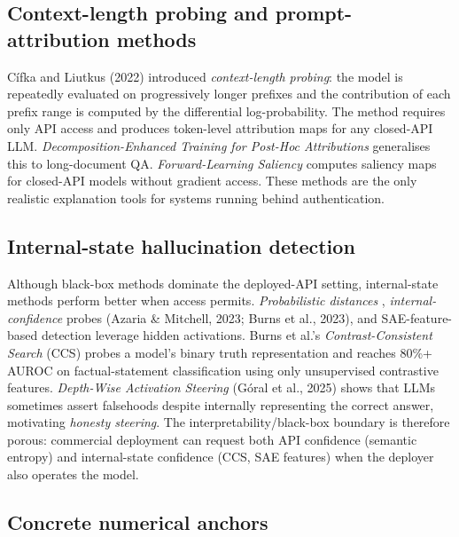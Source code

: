 \documentclass{article}
\begin{document}
\subsection{Context-length probing and prompt-attribution methods}\label{context-length-probing-and-prompt-attribution-methods}

Cífka and Liutkus (2022) introduced \emph{context-length probing}: the model is repeatedly evaluated on progressively longer prefixes and the contribution of each prefix range is computed by the differential log-probability. The method requires only API access and produces token-level attribution maps for any closed-API LLM. \emph{Decomposition-Enhanced Training for Post-Hoc Attributions} \citep{balasubramanian2025decompositionenhan} generalises this to long-document QA. \emph{Forward-Learning Saliency} \citep{zhang2024acomprehensivestud} computes saliency maps for closed-API models without gradient access. These methods are the only realistic explanation tools for systems running behind authentication.

\subsection{Internal-state hallucination detection}\label{internal-state-hallucination-detection}

Although black-box methods dominate the deployed-API setting, internal-state methods perform better when access permits. \emph{Probabilistic distances} \citep{oblovatny2025probabilisticdista}, \emph{internal-confidence} probes (Azaria \& Mitchell, 2023; Burns et al., 2023), and SAE-feature-based detection \citep{bereska2024mechanisticinterpr} leverage hidden activations. Burns et al.'s \emph{Contrast-Consistent Search} (CCS) probes a model's binary truth representation and reaches 80\%+ AUROC on factual-statement classification using only unsupervised contrastive features. \emph{Depth-Wise Activation Steering} (Góral et al., 2025) shows that LLMs sometimes assert falsehoods despite internally representing the correct answer, motivating \emph{honesty steering}. The interpretability/black-box boundary is therefore porous: commercial deployment can request both API confidence (semantic entropy) and internal-state confidence (CCS, SAE features) when the deployer also operates the model.

\subsection{Concrete numerical anchors}\label{concrete-numerical-anchors-1}
\end{document}
